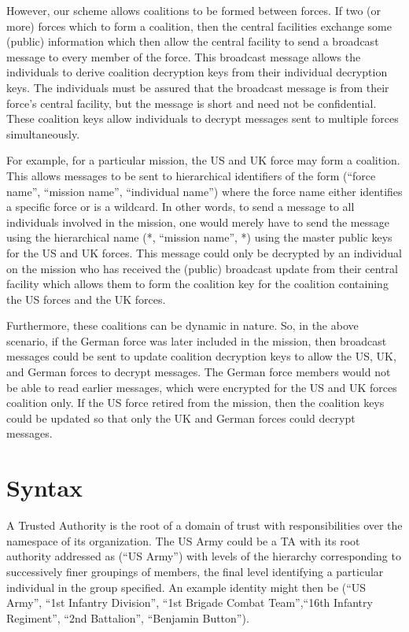 \documentclass[10pt]{llncs}
\begin{document}
However, our scheme allows coalitions to be formed between forces.
If two (or more) forces which to form a coalition, then the central
facilities exchange some (public) information which then allow the
central facility to send a broadcast message to every member of the
force. This broadcast message allows the individuals to derive
coalition decryption keys from their individual decryption keys. The
individuals must be assured that the broadcast message is from their
force's central facility, but the message is short and need not be
confidential. These coalition keys allow individuals to decrypt
messages sent to multiple forces simultaneously.

For example, for a particular mission, the US and UK force may form
a coalition. This allows messages to be sent to hierarchical
identifiers of the form (``force name'', ``mission name'',
``individual name'') where the force name either identifies a
specific force or is a wildcard. In other words, to send a message
to all individuals involved in the mission, one would merely have to
send the message using the hierarchical name (*, ``mission name'',
*) using the master public keys for the US and UK forces. This
message could only be decrypted by an individual on the mission who
has received the (public) broadcast update from their central
facility which allows them to form the coalition key for the
coalition containing the US forces and the UK forces.

Furthermore, these coalitions can be dynamic in nature. So, in the
above scenario, if the German force was later included in the
mission, then broadcast messages could be sent to update coalition
decryption keys to allow the US, UK, and German forces to decrypt
messages. The German force members would not be able to read earlier
messages, which were encrypted for the US and UK forces coalition
only. If the US force retired from the mission, then the coalition
keys could be updated so that only the UK and German forces could
decrypt messages.

\section{Syntax}
A Trusted Authority is the root of a domain of trust with
responsibilities over the namespace of its organization. The US Army
could be a TA with its root authority addressed as (``US Army'')
with levels of the hierarchy corresponding to successively finer
groupings of members, the final level identifying a particular
individual in the group specified. An example identity might then be
(``US Army'', ``1st Infantry Division'', ``1st Brigade Combat
Team'',``16th Infantry Regiment'', ``2nd Battalion'', ``Benjamin
Button'').
\end{document}
